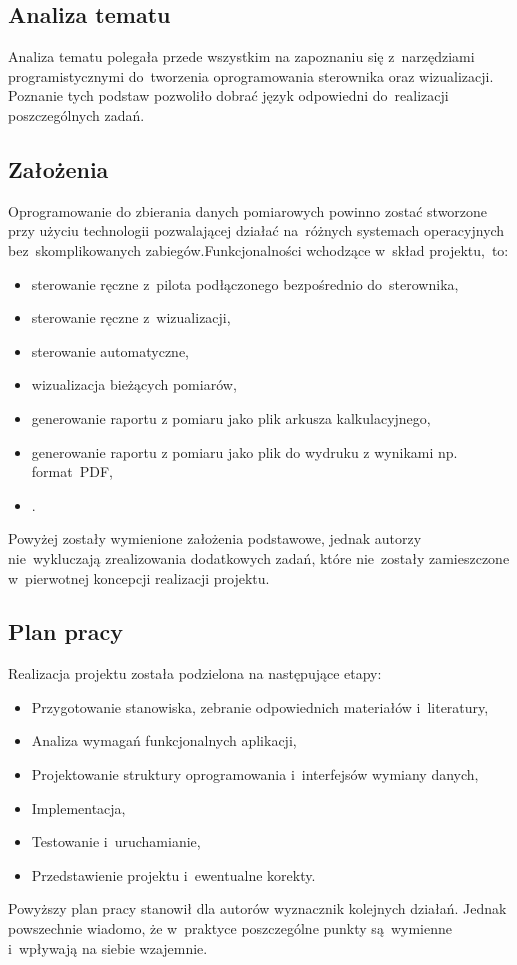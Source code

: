\subsection{Analiza tematu}
Analiza tematu polegała przede wszystkim na zapoznaniu się z~narzędziami programistycznymi do~tworzenia oprogramowania sterownika oraz wizualizacji.
Poznanie tych podstaw pozwoliło dobrać język odpowiedni do~realizacji poszczególnych zadań.

\subsection{Założenia}
Oprogramowanie do zbierania danych pomiarowych powinno zostać stworzone przy użyciu technologii pozwalającej działać na~różnych systemach operacyjnych bez~skomplikowanych zabiegów.Funkcjonalności wchodzące w~skład projektu,~to:
\begin{itemize}
\item sterowanie ręczne z~pilota podłączonego bezpośrednio do~sterownika,
\item sterowanie ręczne z~wizualizacji,
\item sterowanie automatyczne, 
\item wizualizacja bieżących pomiarów,
\item generowanie raportu z pomiaru jako plik arkusza kalkulacyjnego,
\item generowanie raportu z pomiaru jako plik do wydruku z wynikami np. format~PDF,
\item .
\end{itemize}
\indent
\indent Powyżej zostały wymienione założenia podstawowe, jednak autorzy nie~wykluczają zrealizowania dodatkowych zadań, które nie~zostały zamieszczone w~pierwotnej koncepcji realizacji projektu.

\subsection{Plan pracy}
Realizacja projektu została podzielona na następujące etapy:
\begin{itemize}
\item Przygotowanie stanowiska, zebranie odpowiednich materiałów i~literatury,
\item Analiza wymagań funkcjonalnych aplikacji,
\item Projektowanie struktury oprogramowania i~interfejsów wymiany danych,
\item Implementacja,
\item Testowanie i~uruchamianie,
\item Przedstawienie projektu i~ewentualne korekty.
\end{itemize}
\indent
\indent Powyższy plan pracy stanowił dla autorów wyznacznik kolejnych działań. Jednak powszechnie wiadomo, że w~praktyce poszczególne punkty są~wymienne i~wpływają na siebie wzajemnie.

